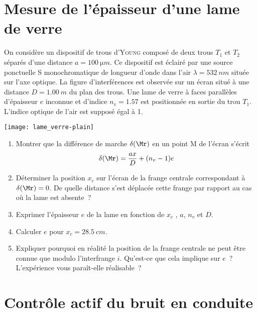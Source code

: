 \documentclass[a4paper, 12pt, final, garamond]{book}
\begin{document}
\section{Mesure de l'épaisseur d'une lame de verre}

On considère un dispositif de trous d'\textsc{Young} composé de deux trous $T_1$
et $T_2$ séparés d'une distance $a = \SI{100}{\micro m}$. Ce dispositif est
éclairé par une source ponctuelle S monochromatique de longueur d'onde dans
l'air $\lambda = \SI{532}{nm}$ située sur l'axe optique. La figure
d'interférences est observée sur un écran situé à une distance $D =
\SI{1.00}{m}$ du plan des trous. Une lame de verre à faces parallèles
d'épaisseur $e$ inconnue et d'indice $n_v = \num{1.57}$ est positionnée en
sortie du trou $T_1$. L'indice optique de l'air est supposé égal à 1.

\begin{center}
    \texttt{[image: lame\_verre-plain]}
\end{center}

\begin{enumerate}
    \item Montrer que la différence de marche $\delta(\Mr)$ en un point M de l'écran
        s'écrit
        \[\delta(\Mr) = \frac{ax}{D} + (n_v - 1)e\]
    \item Déterminer la position $x_c$ sur l'écran de la frange centrale
        correspondant à $\delta(\Mr) = 0$. De quelle distance s'est déplacée
        cette frange par rapport au cas où la lame est absente~?
    \item Exprimer l'épaisseur $e$ de la lame en fonction de $x_c$ , $a$, $n_v$
        et $D$.
    \item Calculer $e$ pour $x_c = \SI{28.5}{cm}$.
    \item Expliquer pourquoi en réalité la position de la frange centrale ne
        peut être connue que modulo l'interfrange $i$. Qu'est-ce que cela
        implique sur $e$~? L'expérience vous paraît-elle réalisable~?
\end{enumerate}

\section{Contrôle actif du bruit en conduite}
\end{document}
